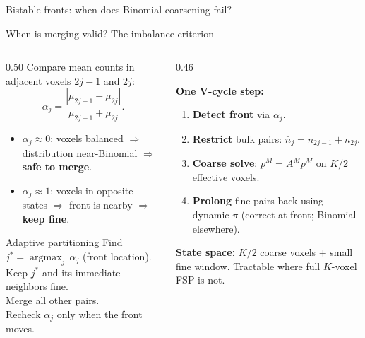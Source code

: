 \documentclass[10pt,aspectratio=169]{beamer}
\begin{document}
\begin{frame}{Bistable fronts: when does Binomial coarsening fail?}
\end{frame}


\begin{frame}{When is merging valid? The imbalance criterion}

  \begin{columns}[T]
    \begin{column}{0.50\textwidth}
      Compare mean counts in adjacent voxels $2j{-}1$ and $2j$:
      \[
        \alpha_j = \frac{|\mu_{2j-1} - \mu_{2j}|}{\mu_{2j-1}+\mu_{2j}}.
      \]

      \begin{itemize}\setlength\itemsep{0.4em}
        \item $\alpha_j \approx 0$: voxels balanced
              $\Rightarrow$ distribution near-Binomial $\Rightarrow$ \textbf{safe to merge}.
        \item $\alpha_j \approx 1$: voxels in opposite states
              $\Rightarrow$ front is nearby $\Rightarrow$ \textbf{keep fine}.
      \end{itemize}

      \medskip
      \begin{block}{Adaptive partitioning}
        Find $j^* = \operatorname{argmax}_j\,\alpha_j$ (front location).\\[0.2em]
        Keep $j^*$ and its immediate neighbors fine.\\
        Merge all other pairs.\\[0.3em]
        Recheck $\alpha_j$ only when the front moves.
      \end{block}
    \end{column}
    \begin{column}{0.46\textwidth}

      \textbf{One V-cycle step:}
      \begin{enumerate}\setlength\itemsep{0.3em}
        \item \textbf{Detect front} via $\alpha_j$.
        \item \textbf{Restrict} bulk pairs: $\bar n_j = n_{2j-1}+n_{2j}$.
        \item \textbf{Coarse solve}: $\dot p^M = A^M p^M$
              on $K/2$ effective voxels.
        \item \textbf{Prolong} fine pairs back using dynamic-$\pi$
              (correct at front; Binomial elsewhere).
      \end{enumerate}

      \medskip
      {\small\textbf{State space:} $K/2$ coarse voxels $+$ small fine window.
      Tractable where full $K$-voxel FSP is not.}

    \end{column}
  \end{columns}

\end{frame}
\end{document}
